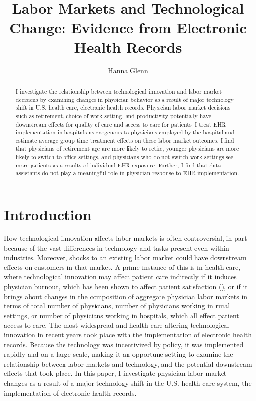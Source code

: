 \documentclass[11pt]{article}
\title{Labor Markets and Technological Change: Evidence from Electronic Health Records}
\author{Hanna Glenn}
\begin{document}
\maketitle

\begin{abstract}
    I investigate the relationship between technological innovation and labor market decisions by examining changes in physician behavior as a result of major technology shift in U.S. health care, electronic health records. Physician labor market decisions such as retirement, choice of work setting, and productivity potentially have downstream effects for quality of care and access to care for patients. I treat EHR implementation in hospitals as exogenous to physicians employed by the hospital and estimate average group time treatment effects on these labor market outcomes. I find that physicians of retirement age are more likely to retire, younger physicians are more likely to switch to office settings, and physicians who do not switch work settings see more patients as a results of individual EHR exposure. Further, I find that data assistants do not play a meaningful role in physician response to EHR implementation. 
\end{abstract}

\vspace{1.5cm}

\section{Introduction}

How technological innovation affects labor markets is often controversial, in part because of the vast differences in technology and tasks present even within industries. Moreover, shocks to an existing labor market could have downstream effects on customers in that market. A prime instance of this is in health care, where technological innovation may affect patient care indirectly if it induces physician burnout, which has been shown to affect patient satisfaction (\cite{shanafelt2002burnout}), or if it brings about changes in the composition of aggregate physician labor markets in terms of total number of physicians, number of physicians working in rural settings, or number of physicians working in hospitals, which all effect patient access to care. The most widespread and health care-altering technological innovation in recent years took place with the implementation of electronic health records. Because the technology was incentivized by policy, it was implemented rapidly and on a large scale, making it an opportune setting to examine the relationship between labor markets and technology, and the potential downstream effects that took place. In this paper, I investigate physician labor market changes as a result of a major technology shift in the U.S. health care system, the implementation of electronic health records.
\end{document}
